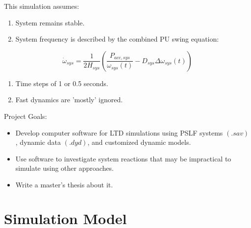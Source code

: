 \documentclass[14pt, unknownkeysallowed]{beamer}
\newcounter{assumptions}
\begin{document}
\begin{frame}
This simulation assumes:
\begin{enumerate}
	\item System remains stable.
	\item System frequency is described by the combined PU swing equation:
	\setcounter{assumptions}{\value{enumi}} %
\end{enumerate}
	\[ \dot{\omega}_{sys} = \dfrac{1}{2H_{sys} } \left( \dfrac{P_{acc, sys} }{\omega_{sys}(t)} - D_{sys}\Delta\omega_{sys}(t)  \right)  \]
\begin{enumerate}
	\setcounter{enumi}{\value{assumptions}}
		\item Time steps of 1 or 0.5 seconds.
		\item Fast dynamics are 'mostly' ignored.
\end{enumerate}
\end{frame}
\begin{frame}
Project Goals:
\begin{itemize}
	\item Develop computer software for LTD simulations using PSLF systems $(.sav)$, dynamic data $(.dyd)$, and customized dynamic models.
	\item Use software to investigate system reactions that may be impractical to simulate using other approaches.
	\item Write a master's thesis about it.
\end{itemize}

\end{frame}
\section{Simulation Model}
\end{document}
